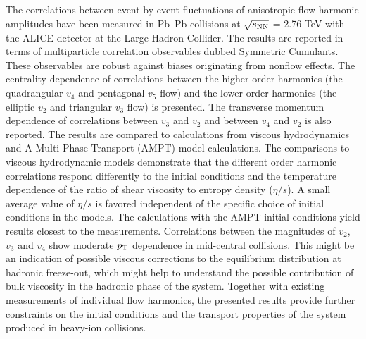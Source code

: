The correlations between event-by-event fluctuations of anisotropic flow harmonic amplitudes
have been measured in Pb--Pb collisions at $\sqrt{s_{\rm NN}}$ = 2.76 TeV with the ALICE detector at the Large Hadron Collider. 
The results are reported in terms of multiparticle correlation observables dubbed Symmetric Cumulants.
These observables are robust against biases originating from nonflow effects. 
The centrality dependence of correlations between the higher order harmonics (the quadrangular $v_4$ and pentagonal $v_5$ flow) and the lower order harmonics (the elliptic $v_2$ and triangular $v_3$ flow)
is presented. The transverse momentum dependence of correlations between $v_3$ and $v_2$ and between $v_4$ and $v_2$ is also reported. 
The results are compared to calculations from viscous hydrodynamics and  A Multi-Phase Transport ({AMPT}) model calculations.
The comparisons to viscous hydrodynamic models demonstrate that
the different order harmonic correlations respond differently to the initial conditions and the temperature dependence of the ratio of shear viscosity to entropy density ($\eta/s$). 
A small average value of $\eta/s$ is favored independent of the specific choice of initial conditions in the models. The calculations with the AMPT initial conditions yield results closest to the measurements. 
Correlations between the magnitudes of $v_2$, $v_3$ and $v_4$ show moderate $p_{\rm T}$ dependence in mid-central collisions. This might be an indication of possible viscous corrections to the equilibrium distribution at hadronic freeze-out, which might help to understand the possible contribution of bulk viscosity in the hadronic phase of the system.
Together with existing measurements of individual flow harmonics, the presented results provide further constraints 
on the initial conditions and the transport properties of the system produced in heavy-ion collisions.
